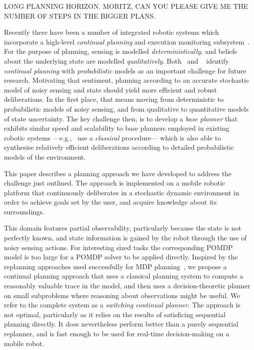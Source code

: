 


LONG PLANNING HORIZON. MORITZ, CAN YOU PLEASE GIVE ME THE NUMBER OF
STEPS IN THE BIGGER PLANS. 

Recently there have been a number of integrated robotic systems which
incorporate a high-level {\em continual planning} and execution
monitoring
subsystem~\cite{wyattetal2010tamd,talamadupula:2010,Kraft2008}.
For the purpose of planning, sensing is modelled {\em
deterministically}, and beliefs about the underlying state are
modelled {\em qualitatively}.
Both~\citeauthor{talamadupula:2010} and
~\citeauthor{wyattetal2010tamd} identify
\emph{continual planning} with {\em probabilistic}
models as an important challenge for future research.
Motivating that sentiment, planning according to an accurate
stochastic model of noisy sensing and state should yield more
efficient and robust deliberations.
In the first place, that means moving from deterministic to
probabilistic models of noisy sensing, and from qualitative to
quantitative models of state uncertainty. The key challenge then, is
to develop a {\em base planner} that exhibits similar speed and
scalability to base planners employed in existing robotic systems
---e.g.,~\citeauthor{wyattetal2010tamd} use a {\em classical}
procedure--- which is also able to synthesise relatively efficient
deliberations according to detailed probabilistic models of the
environment.


This paper describes a planning approach we have developed to address
the challenge just outlined. The approach is implemented on a mobile
robotic platform that continuously deliberates in a stochastic dynamic
environment in order to achieve goals set by the user, and acquire
knowledge about its surroundings.


This domain features partial observability, particularly
because the state is not perfectly known, and state information is
gained by the robot through the use of noisy sensing
actions. 
For
interesting sized tasks the corresponding POMDP model is too large for a
POMDP solver to be applied directly. Inspired by the replanning
approaches used successfully for MDP
planning~\cite{yoon:etal:2007}, we propose a continual
planning approach that uses a classical planning system to compute a
reasonably valuable trace in the model, and then uses a
decision-theoretic planner on small subproblems where reasoning about
observations might be useful. We refer to the complete system as a
{\em switching continual planner}. The approach is not optimal,
particularly as it relies on the results of satisficing sequential planning
directly. It does nevertheless perform better than a purely sequential
replanner, and is fast enough to be used for real-time decision-making
on a mobile robot.





